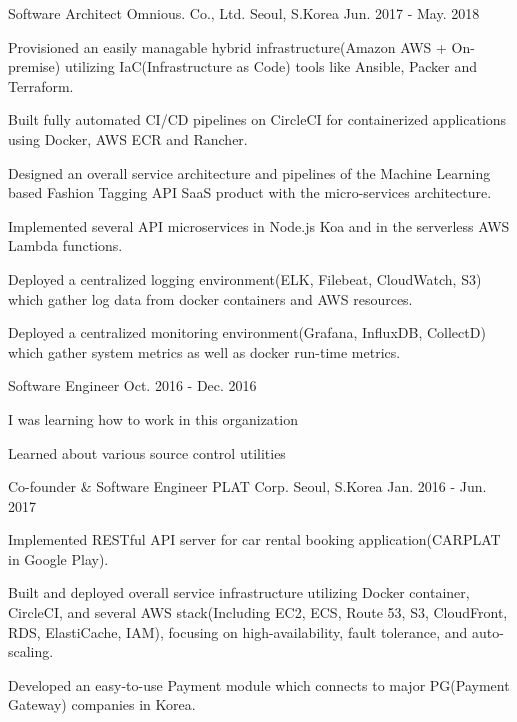\begin{cventries}
  \cventry
    {Software Architect} %
    {Omnious. Co., Ltd.} %
    {Seoul, S.Korea} %
    {Jun. 2017 - May. 2018} %
    {
      \begin{cvitems} %
        \item {Provisioned an easily managable hybrid infrastructure(Amazon AWS + On-premise) utilizing IaC(Infrastructure as Code) tools like Ansible, Packer and Terraform.}
        \item {Built fully automated CI/CD pipelines on CircleCI for containerized applications using Docker, AWS ECR and Rancher.}
        \item {Designed an overall service architecture and pipelines of the Machine Learning based Fashion Tagging API SaaS product with the micro-services architecture.}
        \item {Implemented several API microservices in Node.js Koa and in the serverless AWS Lambda functions.}
        \item {Deployed a centralized logging environment(ELK, Filebeat, CloudWatch, S3) which gather log data from docker containers and AWS resources.}
        \item {Deployed a centralized monitoring environment(Grafana, InfluxDB, CollectD) which gather system metrics as well as docker run-time metrics.}
      \end{cvitems}
    }

  \cventry
    {Software Engineer} %
    {}
    {}
    {Oct. 2016 - Dec. 2016} %
    {
      \begin{cvitems}
        \item {I was learning how to work in this organization}
        \item {Learned about various source control utilities}
      \end{cvitems}
    }
    {}

  \cventry
    {Co-founder \& Software Engineer} %
    {PLAT Corp.} %
    {Seoul, S.Korea} %
    {Jan. 2016 - Jun. 2017} %
    {
      \begin{cvitems} %
        \item {Implemented RESTful API server for car rental booking application(CARPLAT in Google Play).}
        \item {Built and deployed overall service infrastructure utilizing Docker container, CircleCI, and several AWS stack(Including EC2, ECS, Route 53, S3, CloudFront, RDS, ElastiCache, IAM), focusing on high-availability, fault tolerance, and auto-scaling.}
        \item {Developed an easy-to-use Payment module which connects to major PG(Payment Gateway) companies in Korea.}
      \end{cvitems}
    }


\end{cventries}
